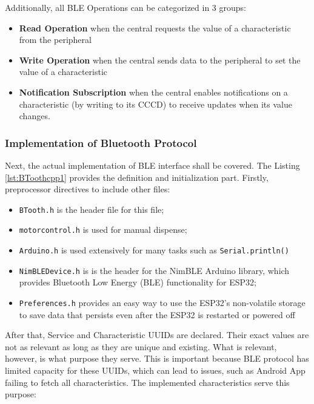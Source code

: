 Additionally, all \ac{BLE} Operations can be categorized in 3 groups:
\begin{itemize}
	\item \textbf{Read Operation} when the central requests the value of a characteristic from the peripheral
	\item \textbf{Write Operation} when the central sends data to the peripheral to set the value of a characteristic
	\item \textbf{Notification Subscription} when the central enables notifications on a characteristic (by writing to its \ac{CCCD}) to receive updates when its value changes.
\end{itemize}
\subsubsection{Implementation of Bluetooth Protocol}
Next, the actual implementation of \ac{BLE} interface shall be covered. The Listing \ref{lst:BToothcpp1} provides the definition and initialization part.  Firstly, preprocessor directives to include other files: 
\begin{itemize}
	\item \texttt{BTooth.h} is the header file for this file;
	\item \texttt{motorcontrol.h} is used for manual dispense;
	\item \texttt{Arduino.h} is used extensively for many tasks such as \texttt{Serial.println()}
	\item \texttt{NimBLEDevice.h} is is the header for the NimBLE Arduino library, which provides Bluetooth Low Energy (BLE) functionality for ESP32;
	\item \texttt{Preferences.h} provides an easy way to use the ESP32's non-volatile storage to save data that persists even after the ESP32 is restarted or powered off
\end{itemize}
After that, Service and Characteristic \ac{UUID}s are declared. Their exact values are not as relevant as long as they are unique and existing. What is relevant, however, is what purpose they serve. This is important because \ac{BLE} protocol has limited capacity for these \ac{UUID}s, which can lead to issues, such as Android App failing to fetch all characteristics. The implemented characteristics serve this purpose:
